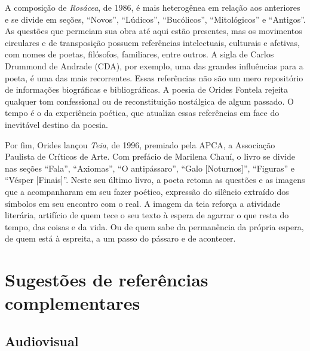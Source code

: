 \documentclass[12pt]{extarticle}
\begin{document}
A composição de \emph{Rosácea}, de 1986, é mais heterogênea em relação
aos anteriores e se divide em seções, ``Novos'', ``Lúdicos'',
``Bucólicos'', ``Mitológicos'' e ``Antigos''. As questões que permeiam
sua obra até aqui estão presentes, mas os movimentos circulares e de
transposição possuem referências intelectuais, culturais e afetivas, com
nomes de poetas, filósofos, familiares, entre outros. A sigla de Carlos
Drummond de Andrade (CDA), por exemplo, uma das grandes influências para
a poeta, é uma das mais recorrentes. Essas referências não são um mero
repositório de informações biográficas e bibliográficas. A poesia de
Orides Fontela rejeita qualquer tom confessional ou de reconstituição
nostálgica de algum passado. O tempo é o da experiência poética, que
atualiza essas referências em face do inevitável destino da poesia.






Por fim, Orides lançou \emph{Teia}, de 1996, premiado pela APCA, a
Associação Paulista de Críticos de Arte. Com prefácio de Marilena Chauí,
o livro se divide nas seções ``Fala'', ``Axiomas'', ``O antipássaro'',
``Galo {[}Noturnos{]}'', ``Figuras'' e ``Vésper {[}Finais{]}''. Neste
seu último livro, a poeta retoma as questões e as imagens que a
acompanharam em seu fazer poético, expressão do silêncio extraído dos
símbolos em seu encontro com o real. A imagem da teia reforça a
atividade literária, artifício de quem tece o seu texto à espera de
agarrar o que resta do tempo, das coisas e da vida. Ou de quem sabe da
permanência da própria espera, de quem está à espreita, a um passo do
pássaro e de acontecer.




\section{Sugestões de referências complementares}

\subsection{Audiovisual}
\end{document}
